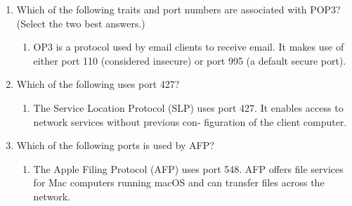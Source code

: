 \documentclass{article}
\begin{document}
\begin{enumerate}
\begin{enumerate}
    \end{enumerate}
    \item Which	of	the	following	traits	and	port	numbers	are	associated
with	POP3?	(Select	the	two	best	answers.)

    \begin{enumerate}
        \item OP3	is	a	protocol	used	by	email	clients	to	receive
email.	It	makes	use	of	either	port	110	(considered	insecure)	or
port	995	(a	default	secure	port).

    \end{enumerate}
    \item Which	of	the	following	uses	port	427?

    \begin{enumerate}
        \item The	Service	Location	Protocol	(SLP)	uses	port
427.	It	enables	access	to	network	services	without	previous	con‐
figuration	of	the	client	computer.

    \end{enumerate}
    \item Which	of	the	following	ports	is	used	by	AFP?

    \begin{enumerate}
        \item The	Apple	Filing	Protocol	(AFP)	uses	port	548.
AFP	offers	file	services	for	Mac	computers	running	macOS	and
can	transfer	files	across	the	network.


\end{enumerate}
\end{enumerate}
\end{document}
